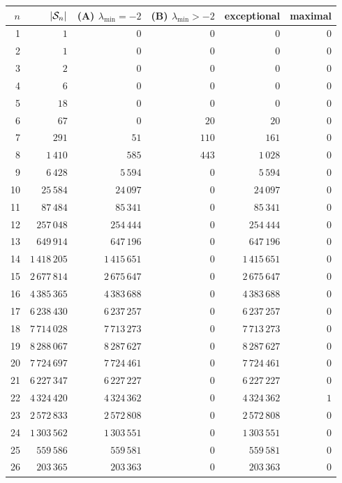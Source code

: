 \begin{tabular}{rrrrrr}
\toprule
$n$ & $\lvert{\mathcal S}_n\rvert$ & (A) $\lambda_{\min}=-2$ & (B) $\lambda_{\min}>-2$ & exceptional & maximal\\
\midrule
1 & $1$ & $0$ & $0$ & $0$ & $0$\\
2 & $1$ & $0$ & $0$ & $0$ & $0$\\
3 & $2$ & $0$ & $0$ & $0$ & $0$\\
4 & $6$ & $0$ & $0$ & $0$ & $0$\\
5 & $18$ & $0$ & $0$ & $0$ & $0$\\
6 & $67$ & $0$ & $20$ & $20$ & $0$\\
7 & $291$ & $51$ & $110$ & $161$ & $0$\\
8 & $1\,410$ & $585$ & $443$ & $1\,028$ & $0$\\
9 & $6\,428$ & $5\,594$ & $0$ & $5\,594$ & $0$\\
10 & $25\,584$ & $24\,097$ & $0$ & $24\,097$ & $0$\\
11 & $87\,484$ & $85\,341$ & $0$ & $85\,341$ & $0$\\
12 & $257\,048$ & $254\,444$ & $0$ & $254\,444$ & $0$\\
13 & $649\,914$ & $647\,196$ & $0$ & $647\,196$ & $0$\\
14 & $1\,418\,205$ & $1\,415\,651$ & $0$ & $1\,415\,651$ & $0$\\
15 & $2\,677\,814$ & $2\,675\,647$ & $0$ & $2\,675\,647$ & $0$\\
16 & $4\,385\,365$ & $4\,383\,688$ & $0$ & $4\,383\,688$ & $0$\\
17 & $6\,238\,430$ & $6\,237\,257$ & $0$ & $6\,237\,257$ & $0$\\
18 & $7\,714\,028$ & $7\,713\,273$ & $0$ & $7\,713\,273$ & $0$\\
19 & $8\,288\,067$ & $8\,287\,627$ & $0$ & $8\,287\,627$ & $0$\\
20 & $7\,724\,697$ & $7\,724\,461$ & $0$ & $7\,724\,461$ & $0$\\
21 & $6\,227\,347$ & $6\,227\,227$ & $0$ & $6\,227\,227$ & $0$\\
22 & $4\,324\,420$ & $4\,324\,362$ & $0$ & $4\,324\,362$ & $1$\\
23 & $2\,572\,833$ & $2\,572\,808$ & $0$ & $2\,572\,808$ & $0$\\
24 & $1\,303\,562$ & $1\,303\,551$ & $0$ & $1\,303\,551$ & $0$\\
25 & $559\,586$ & $559\,581$ & $0$ & $559\,581$ & $0$\\
26 & $203\,365$ & $203\,363$ & $0$ & $203\,363$ & $0$\\

\end{tabular}
